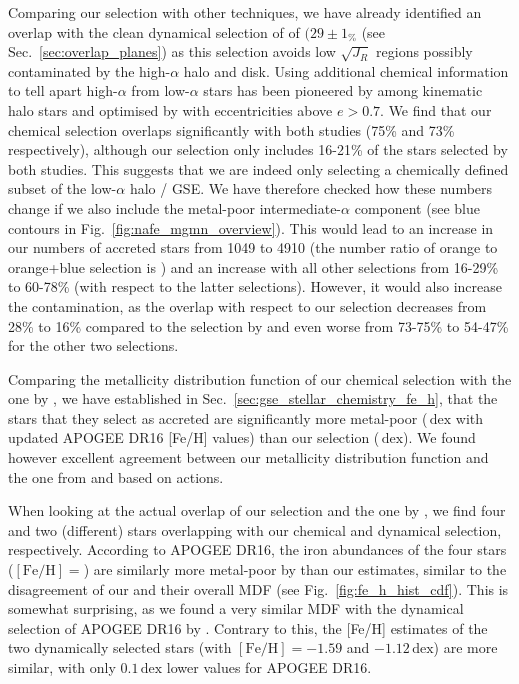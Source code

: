 \documentclass[fleqn,usenatbib]{mnras}
\newcommand{\dex}{\,\mathrm{dex}}	%
\begin{document}
Comparing our selection with other techniques, we have already identified an overlap with the clean dynamical selection of \citet{Feuillet2021} of $(29\pm1_\%$ (see Sec.~\ref{sec:overlap_planes}) as this selection avoids low $\sqrt{J_R}$ regions possibly contaminated by the high-$\alpha$ halo and disk. Using additional chemical information to tell apart high-$\alpha$ from low-$\alpha$ stars has been pioneered by \citet{Nissen2010} among kinematic halo stars and optimised by \citet{Naidu2020} with eccentricities above $e > 0.7$. We find that our chemical selection overlaps significantly with both studies (75\% and 73\% respectively), although our selection only includes 16-21\% of the stars selected by both studies. This suggests that we are indeed only selecting a chemically defined subset of the low-$\alpha$ halo / GSE. We have therefore checked how these numbers change if we also include the metal-poor intermediate-$\alpha$ component (see blue contours in Fig.~\ref{fig:nafe_mgmn_overview}). This would lead to an increase in our numbers of accreted stars from 1049 to 4910 (the number ratio of orange to orange+blue selection is ) and an increase with all other selections from 16-29\% to 60-78\% (with respect to the latter selections). However, it would also increase the contamination, as the overlap with respect to our selection decreases from 28\% to 16\% compared to the selection by \citet{Feuillet2021} and even worse from 73-75\% to 54-47\% for the other two selections.

Comparing the metallicity distribution function of our chemical selection with the one by \citet{Das2020}, we have established in Sec.~\ref{sec:gse_stellar_chemistry_fe_h}, that the stars that they select as accreted are significantly more metal-poor ($\dex$ with updated APOGEE DR16 [Fe/H] values) than our selection ($\dex$). We found however excellent agreement between our metallicity distribution function and the one from \citet{Naidu2020} and \citet{Feuillet2020,Feuillet2021} based on actions.

When looking at the actual overlap of our selection and the one by \citet{Das2020}, we find four and two (different) stars overlapping with our chemical and dynamical selection, respectively. According to APOGEE DR16, the iron abundances of the four stars ($\mathrm{[Fe/H]} = $) are similarly more metal-poor by  than our estimates, similar to the disagreement of our and their overall MDF (see Fig.~\ref{fig:fe_h_hist_cdf}). This is somewhat surprising, as we found a very similar MDF with the dynamical selection of APOGEE DR16 by \citet{Feuillet2021}. Contrary to this, the [Fe/H] estimates of the two dynamically selected stars (with $\mathrm{[Fe/H]} = -1.59$ and $-1.12\dex$) are more similar, with only $0.1\dex$ lower values for APOGEE DR16.
\end{document}
